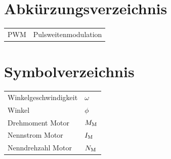 \section*{Abkürzungsverzeichnis}

\begin{tabular}{ll}
%
PWM     &Pulsweitenmodulation\\
\end{tabular}


\section*{Symbolverzeichnis}


\begin{tabular}{ll}
Winkelgeschwindigkeit   &$\omega$\\
Winkel                  &$\phi$\\
Drehmoment Motor        &$M_{\textnormal{M}}$\\
Nennstrom Motor         &$I_{\textnormal{M}}$\\
Nenndrehzahl Motor      &$N_{\textnormal{M}}$\\
\end{tabular}

